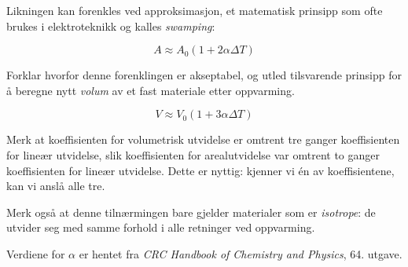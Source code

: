 Likningen kan forenkles ved approksimasjon, et matematisk prinsipp som ofte brukes i elektroteknikk og kalles \textit{swamping}:

$$A \approx A_0 (1 + 2 \alpha \Delta T)$$

Forklar hvorfor denne forenklingen er akseptabel, og utled tilsvarende prinsipp for å beregne nytt \textit{volum} av et fast materiale etter oppvarming.







$$V \approx V_0 (1 + 3 \alpha \Delta T)$$







Merk at koeffisienten for volumetrisk utvidelse er omtrent tre ganger koeffisienten for lineær utvidelse, slik koeffisienten for arealutvidelse var omtrent to ganger koeffisienten for lineær utvidelse. Dette er nyttig: kjenner vi én av koeffisientene, kan vi anslå alle tre.

Merk også at denne tilnærmingen bare gjelder materialer som er \textit{isotrope}: de utvider seg med samme forhold i alle retninger ved oppvarming.

\vskip 10pt

Verdiene for $\alpha$ er hentet fra {\it CRC Handbook of Chemistry and Physics}, 64. utgave.


